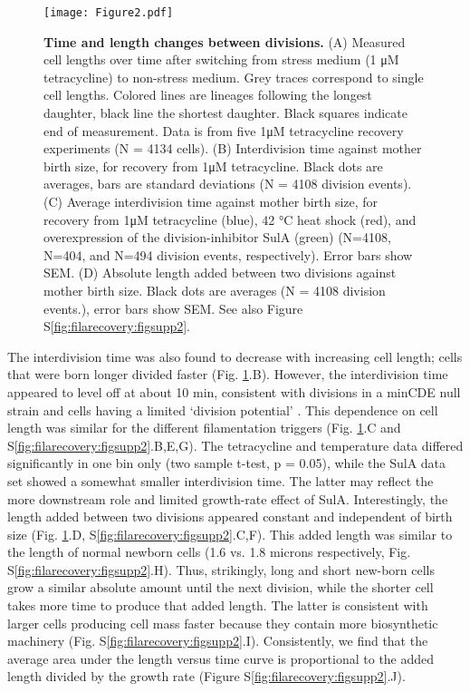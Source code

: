 \begin{figure}
    \centering
    \texttt{[image: Figure2.pdf]}
    \caption{ 
        \textbf{Time and length changes between divisions.}
        (A) Measured cell lengths over time after switching from stress medium (1 μM tetracycline) to non-stress medium. Grey traces correspond to single cell lengths. Colored lines are lineages following the longest daughter, black line the shortest daughter. Black squares indicate end of measurement. Data is from five 1μM tetracycline recovery experiments (N = 4134 cells). (B) Interdivision time against mother birth size, for recovery from 1μM tetracycline. Black dots are averages, bars are standard deviations (N = 4108 division events). (C) Average interdivision time against mother birth size, for recovery from 1μM tetracycline (blue), 42 °C heat shock (red), and overexpression of the division-inhibitor SulA (green) (N=4108, N=404, and  N=494 division events, respectively). Error bars show SEM. (D) Absolute length added between two divisions against mother birth size. Black dots are averages (N = 4108 division events.), error bars show SEM. See also Figure S\ref{fig:filarecovery:figsupp2}.
    }
    \label{fig:filarecovery:fig2} %
\end{figure}

The interdivision time was also found to decrease with increasing cell length; cells that were born longer divided faster (Fig. \ref{fig:filarecovery:fig2}.B). However, the interdivision time appeared to level off at about 10 min, consistent with divisions in a minCDE null strain and cells having a limited ‘division potential’ \cite{Donachie1996}. This dependence on cell length was similar for the different filamentation triggers (Fig. \ref{fig:filarecovery:fig2}.C and S\ref{fig:filarecovery:figsupp2}.B,E,G). The tetracycline and temperature data differed significantly in one bin only (two sample t-test, p = 0.05), while the SulA data set showed a somewhat smaller interdivision time. The latter may reflect the more downstream role and limited growth-rate effect of SulA. Interestingly, the length added between two divisions appeared constant and independent of birth size (Fig. \ref{fig:filarecovery:fig2}.D, S\ref{fig:filarecovery:figsupp2}.C,F). This added length was similar to the length of normal newborn cells (1.6 vs. 1.8 microns respectively, Fig. S\ref{fig:filarecovery:figsupp2}.H). Thus, strikingly, long and short new-born cells grow a similar absolute amount until the next division, while the shorter cell takes more time to produce that added length. The latter is consistent with larger cells producing cell mass faster because they contain more biosynthetic machinery (Fig. S\ref{fig:filarecovery:figsupp2}.I). Consistently, we find that the average area under the length versus time curve is proportional to the added length divided by the growth rate (Figure S\ref{fig:filarecovery:figsupp2}.J). 

